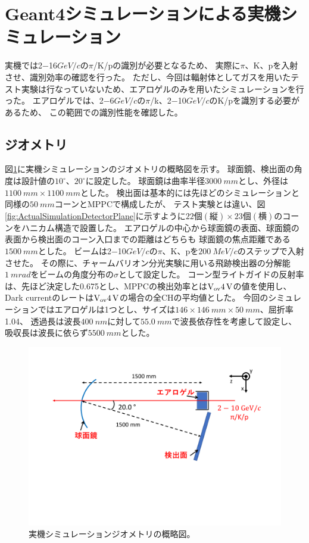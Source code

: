\section{Geant4シミュレーションによる実機シミュレーション}
実機では2$-$16\space$\si{GeV/c}$の$\pi$/K/pの識別が必要となるため、
実際に$\pi$、K、pを入射させ、識別効率の確認を行った。
ただし、今回は輻射体としてガスを用いたテスト実験は行なっていないため、エアロゲルのみを用いたシミュレーションを行った。
エアロゲルでは、2$-$6\space$\si{GeV/c}$の$\pi$/k、2$-$10\space$\si{GeV/c}$のK/pを識別する必要があるため、
この範囲での識別性能を確認した。

\subsection{ジオメトリ}
図\ref{fig:ActualSimulationSetup}に実機シミュレーションのジオメトリの概略図を示す。
球面鏡、検出面の角度は設計値の$10^{\circ}$、$20^{\circ}$に設定した。
球面鏡は曲率半径$\SI{3000}{mm}$とし、外径は$\SI{1100}{mm}\times\SI{1100}{mm}$とした。
検出面は基本的には先ほどのシミュレーションと同様の$\SI{50}{mm}$コーンとMPPCで構成したが、
テスト実験とは違い、図\ref{fig:ActualSimulationDetectorPlane}に示すように$22個(縦)\times23個(横)$のコーンをハニカム構造で設置した。
エアロゲルの中心から球面鏡の表面、球面鏡の表面から検出面のコーン入口までの距離はどちらも
球面鏡の焦点距離である$\SI{1500}{mm}$とした。
ビームは2$-$10\space$\si{GeV/c}$の$\pi$、K、pを$\SI{200}{MeV/c}$のステップで入射させた。
その際に、チャームバリオン分光実験に用いる飛跡検出器の分解能$\SI{1}{mrad}$をビームの角度分布の$\sigma$として設定した。
コーン型ライトガイドの反射率は、先ほど決定した0.675とし、MPPCの検出効率とは$\rm{V_{ov}}\SI{4}{V}$の値を使用し、
Dark currentのレートは$\rm{V_{ov}}\SI{4}{V}$の場合の全CHの平均値とした。
今回のシミュレーションではエアロゲルは1つとし、サイズは$\SI{146}\times\SI{146}{mm}\times\SI{50}{mm}$、屈折率1.04、
透過長は波長$\SI{400}{nm}$に対して$\SI{55.0}{mm}$で波長依存性を考慮して設定し、吸収長は波長に依らず$\SI{5500}{mm}$とした。

\begin{figure}
  \centering
  \includegraphics[width=15cm]{images/chapter4/ActualSimulationSetup.pdf}
  \caption{
    実機シミュレーションジオメトリの概略図。
  }
  \label{fig:ActualSimulationSetup}
\end{figure}


